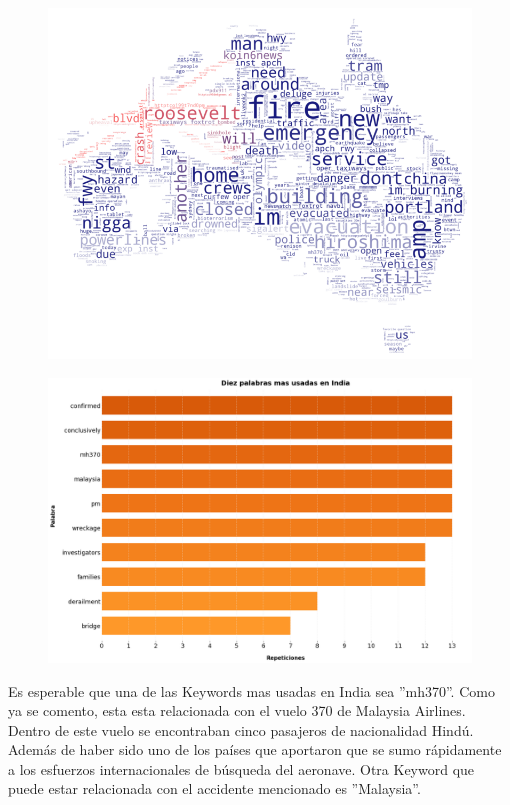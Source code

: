 \documentclass[titlepage,a4paper]{article}
\begin{document}
    \begin{figure}[H]
    \centering
    \includegraphics[width=1\textwidth]{graficos/Analisis de Locacion/bandera_australia.png}
    \caption{}
    \end{figure}
    
    \begin{figure}[H]
    \centering
    \includegraphics[width=1\textwidth]{graficos/Analisis de Locacion/10_palabras_mas_usadas_india.png}
    \caption{}
    \end{figure}
    
    Es esperable que una de las Keywords mas usadas en India sea ''mh370''. Como ya se comento, esta esta relacionada con el vuelo 370 de Malaysia Airlines. Dentro de este vuelo se encontraban cinco pasajeros de nacionalidad Hindú. Además de haber sido uno de los países que aportaron que se sumo rápidamente a los esfuerzos internacionales de búsqueda del aeronave. Otra Keyword que puede estar relacionada con el accidente mencionado es ''Malaysia''.
    
\end{document}

